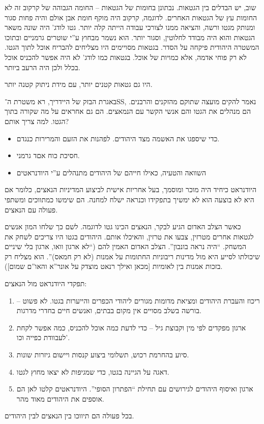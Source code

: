\documentclass[]{article}
\begin{document}
    שוב, יש הבדלים בין הגטאות. נבתונן בחומות של הגטאות – החומה הגבוהה של קרקוב זה לא החומות עץ של הגטאות האחרים. לדוגמה, קרקוב היה מוקף חומת אבן אולם והיה פחות סגור ומנותק מגטו ורשה, והציאה ממנו לצורכי עבודה הייתה קלה יותר. גטו לודג' היה שונה משאר הגטאות והוא היה מבודד לחלוטין, וסגור יותר. הוא נשמר מבחוץ ע''י שוטרים גרמניים ובתוכו המשטרה היהודית פיקחה על הסדר. בגטאות מסויימים היו מצליחים להבריח אוכל לתוך הגטו. לא רק פוחי אדמה, אלא כמויות של אוכל. בגטאות כמו לודג' לא היה אפשר להכניס אוכל בכלל ולכן היה הרעב ביותר. 
    
    היו גם גטאות קטנים יותר, עם מידת ניתוק קטנה יותר. 
    
    באגרת הבזק של היידריך, רא משטרת ה־SS, נאמר להקים מועצה שתוקם מהזקנים והרבנים. הם מנהלים את הגטו והם אנשי הקשר עם הנמאצים. הם גם אחראים על מה שקורה בתוך הגטו. 
    למה צריך אותם? 
    \begin{itemize}
        \item כדי שיספגו את האשמה מצד היהודים. לפהנות את הזעם והמרירות כנגדם. 
        \item חסיכת כוח אםד גרמני. 
        \item השוואה והטעיה, כאילו חייהם של היהודים מתנהלים ע''י היודנראטים
    \end{itemize}
    
    היודנראט כיחיד היה מוכר ומוסמך, בעל אחריות אישית לביצוע המדיניות הנאצים, כלומר אם היא לא בוצעה הוא לא ימשיך בתפקידו וכנראה ישלח למחנה. הם שימשו כמתווכים ומשתפי פעולה עם הנאצים. 
    
    כאשר הצלב האדום הגיע לבקר, הנאצים הכינו גטו לדוגמה. לשם כך שלחו המון אנשים לגטאות אחרים מטרזין, צבעו את טרזין, והאיכלו אותם. היהודים בגטו היו צריכים לשחק את המשחק. ``היה נראה בונבון''. הצלב האדום האמין להם (``לא ארגון וואו, ארגון בלי שיניים שיכולתו לסייע היא מול מדינות ריבוניות החתומות על אמנות (לא רק חמאס)''. הוא מצליח רק בזכות אמנות בין לאומיות [מכאן ואילך רנאט מוצדק על אונר''א והאו''ם שמום]). 
    
    תפקדי היודנראט מול הנאצים: 
    \begin{enumerate}
        \item ריכוז והעברת היהודים ומציאת מדומות מגורים ליהודי הכפרים והייערות בגטו. לא פשוט – בורשה בשלב מסויים אין מקום בבתים, ואנשים חיים בחדרי מדרגות. 
        \item ארגון מפקדים לפי מין וקבוצת גיל – כדי לדעת כמה אוכל להכניס, כמה אפשר לקחת לעבוודת כפייה וכו'. 
        \item סיוע בהחרמת רכוש, תשלומי ביצוע קנסות ויישום גיזרות שונות. 
        \item דאגה על הגיינה בגטו, כדי שמגיפות לא יצאו מחוץ לגטו. 
        \item ארגון ואיסוף היהודים לגירושים עם תחילת ``הפתרון הסופי''. היודנראטים קלטו לאן הם אוספים את היהודים מאוד מהר. 
    \end{enumerate}
    בכל פעולה הם תיווכו בין הנאצים לבין היהודים. 
    
\end{document}
